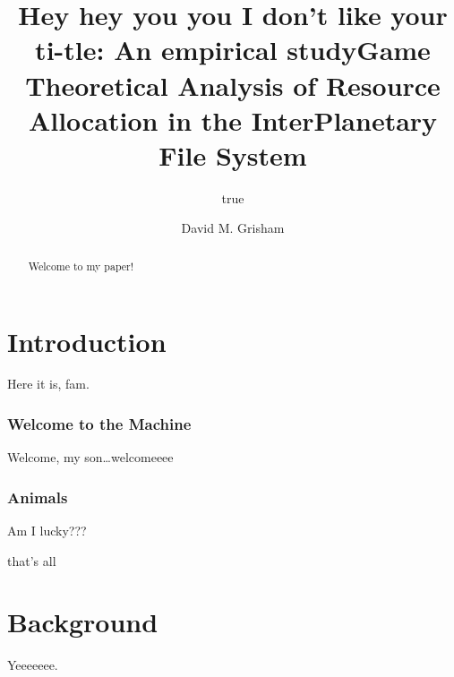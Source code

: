 \documentclass[12pt,letterpaper,]{article}
\title{Hey hey you you I don't like your ti-tle: An empirical study}
\author{true}
\date{}
\title{Game Theoretical Analysis of Resource Allocation in the InterPlanetary File System}
\author{David M. Grisham}
\begin{document}
\frontmatter

\maketitle
\newpage

\makecopyright{\the\year}
\newpage

\makesubmittal
\newpage

\begin{abstract}
Welcome to my paper!
\end{abstract}

\newpage



\hypersetup{linkcolor=black}
\setcounter{tocdepth}{2}
\tableofcontents

\listoffiguresandtables

\bodymatter

\hypertarget{introduction}{%
\chapter{Introduction}\label{introduction}}

Here it is, fam.

\hypertarget{welcome-to-the-machine}{%
\subsection{Welcome to the Machine}\label{welcome-to-the-machine}}

Welcome, my son\ldots{}welcomeeee

\hypertarget{animals}{%
\subsection{Animals}\label{animals}}

Am I lucky???

that's all

\hypertarget{background}{%
\chapter{Background}\label{background}}

Yeeeeeee.

                

    
\end{document}
